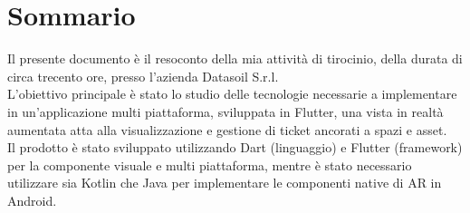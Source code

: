 
\cleardoublepage
{}
{}
\begingroup
\let\clearpage\relax
\let\cleardoublepage\relax
\let\cleardoublepage\relax

\chapter*{Sommario}

Il presente documento è il resoconto della mia attività di tirocinio, della durata di circa trecento ore, presso l'azienda Datasoil S.r.l.\\
L'obiettivo principale è stato lo studio delle tecnologie necessarie a implementare in un'applicazione multi piattaforma, sviluppata in Flutter, una vista in realtà aumentata atta alla visualizzazione e gestione di ticket ancorati a spazi e asset.\\
Il prodotto è stato sviluppato utilizzando Dart (linguaggio) e Flutter (framework) per la componente visuale e multi piattaforma, mentre è stato necessario utilizzare sia Kotlin che Java per implementare le componenti native di AR in Android.

%
%

\endgroup			

\vfill

